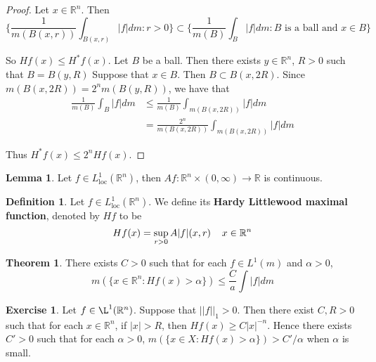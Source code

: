 \documentclass[12pt]{amsart}
\theoremstyle{definition}
\newtheorem{defn}[definition]{Definition}
\newtheorem{thm}[definition]{Theorem}
\newtheorem{lem}[definition]{Lemma}
\newtheorem{ex}[definition]{Exercise}
\newcommand{\al}{\alpha}
\newcommand{\R}{\mathbb{R}}
\newcommand{\Ll}{L^1_{\text{loc}}(\R^n)}
\begin{document}
	\begin{proof}
		Let $x \in \R^n$. Then $$\bigg \{ \frac{1}{m(B(x,r))}\int_{B(x,r)}|f|dm: r >0\bigg \} \subset \bigg\{ \frac{1}{m(B)}\int_{B}|f|dm: B \text{ is a ball and } x \in B \bigg\} $$
		
		So $Hf(x) \leq H^*f(x)$. Let $B$ be a ball. Then there exists $y \in \R^n$, $R>0$ such that $B = B(y,R)$ Suppose that $x \in B$. Then $B \subset B(x,2R)$. Since $m(B(x,2R)) = 2^n m(B(y,R))$, we have that 
		\begin{align*}
			\frac{1}{m(B)}\int_{B}|f|dm
			& \leq \frac{1}{m(B)} \int_{m(B(x,2R))}|f|dm\\
			&= \frac{2^n}{m(B(x,2R))} \int_{m(B(x,2R))}|f|dm
		\end{align*}
		
		Thus $H^*f(x) \leq 2^n Hf(x)$.
	\end{proof}
	
	\begin{lem}
		Let $f \in \Ll$, then $Af:\R^n \times (0, \infty)\rightarrow \R$ is continuous.
	\end{lem}
	
	\begin{defn}
		Let $f \in \Ll$. We define its \textbf{Hardy Littlewood maximal function}, denoted by $Hf$ to be $$Hf(x) = \sup_{r>0} A|f|(x,r) \hspace{4mm} x \in \R^n$$
	\end{defn}
	
	\begin{thm}
		There exists $C >0$ such that for each $f \in L^1(m)$ and $\al > 0$, $$m(\{x \in \R^n: Hf(x) > \al\}) \leq \frac{C}{a} \int |f|dm$$
	\end{thm}
	
	\begin{ex}
		Let $f \in \L^1(\R^n)$. Suppose that $||f||_1>0$. Then there exist $C,R>0$ such that for each $x \in \R^n$, if $|x| > R$, then $Hf(x) \geq C|x|^{-n}$. Hence there exists $C' > 0$ such that for each $\al >0$, $m(\{x \in X: Hf(x)>\alpha\}) > C'/\al$ when $\al$ is small. 
	\end{ex}
	
\end{document}
